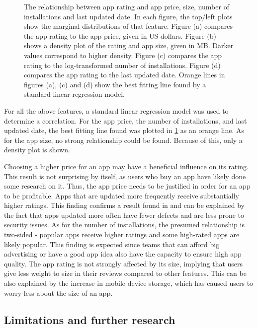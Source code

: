 \documentclass{article}
\begin{document}
\begin{figure}[ht]
\caption{The relationship between app rating and app price, size, number of installations and last updated date. In each figure, the top/left plots show the marginal distributions of that feature. Figure (a) compares the app rating to the app price, given in US dollars. Figure (b) shows a density plot of the rating and app size, given in MB. Darker values correspond to higher density. Figure (c) compares the app rating to the log-transformed number of installations. Figure (d) compares the app rating to the last updated date. Orange lines in figures (a), (c) and (d) show the best fitting line found by a standard linear regression model.}
\label{fig2} 
\end{figure}

For all the above features, a standard linear regression model was used to determine a correlation. For the app price, the number of installations, and last updated date, the best fitting line found was plotted in \cref{fig2} as an orange line. As for the app size, no strong relationship could be found. Because of this, only a density plot is shown. 

Choosing a higher price for an app may have a beneficial influence on its rating. This result is not surprising by itself, as users who buy an app have likely done some research on it. Thus, the app price needs to be justified in order for an app to be profitable. Apps that are updated more frequently receive substantially higher ratings. This finding confirms a result found in \cite{freshapps} and can be explained by the fact that apps updated more often have fewer defects and are less prone to security issues. As for the number of installations, the presumed relationship is two-sided - popular apps receive higher ratings and some high-rated apps are likely popular. This finding is expected since teams that can afford big advertising or have a good app idea also have the capacity to ensure high app quality.  The app rating is not strongly affected by its size, implying that users give less weight to size in their reviews compared to other features. This can be also explained by the increase in mobile device storage, which has caused users to worry less about the size of an app. 

\subsection{Limitations and further research}
\end{document}
